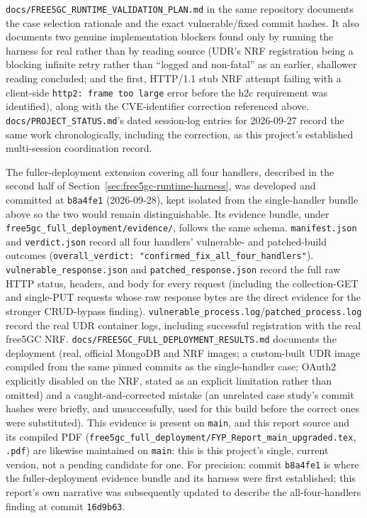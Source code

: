 \documentclass[12pt,a4paper]{report}
\begin{document}
\texttt{docs/FREE5GC\_RUNTIME\_VALIDATION\_PLAN.md} in the same repository documents the case selection rationale and the exact vulnerable/fixed commit hashes. It also documents two genuine implementation blockers found only by running the harness for real rather than by reading source (UDR's NRF registration being a blocking infinite retry rather than ``logged and non-fatal'' as an earlier, shallower reading concluded; and the first, HTTP/1.1 stub NRF attempt failing with a client-side \texttt{http2: frame too large} error before the h2c requirement was identified), along with the CVE-identifier correction referenced above. \texttt{docs/PROJECT\_STATUS.md}'s dated session-log entries for 2026-09-27 record the same work chronologically, including the correction, as this project's established multi-session coordination record.

The fuller-deployment extension covering all four handlers, described in the second half of Section~\ref{sec:free5gc-runtime-harness}, was developed and committed at \texttt{b8a4fe1} (2026-09-28), kept isolated from the single-handler bundle above so the two would remain distinguishable. Its evidence bundle, under \texttt{free5gc\_full\_deployment/evidence/}, follows the same schema. \texttt{manifest.json} and \texttt{verdict.json} record all four handlers' vulnerable- and patched-build outcomes (\texttt{overall\_verdict: "confirmed\_fix\_all\_four\_handlers"}). \texttt{vulnerable\_response.json} and \texttt{patched\_response.json} record the full raw HTTP status, headers, and body for every request (including the collection-GET and single-PUT requests whose raw response bytes are the direct evidence for the stronger CRUD-bypass finding). \texttt{vulnerable\_process.log}/\texttt{patched\_process.log} record the real UDR container logs, including successful registration with the real free5GC NRF. \texttt{docs/FREE5GC\_FULL\_DEPLOYMENT\_RESULTS.md} documents the deployment (real, official MongoDB and NRF images; a custom-built UDR image compiled from the same pinned commits as the single-handler case; OAuth2 explicitly disabled on the NRF, stated as an explicit limitation rather than omitted) and a caught-and-corrected mistake (an unrelated case study's commit hashes were briefly, and unsuccessfully, used for this build before the correct ones were substituted). This evidence is present on \texttt{main}, and this report source and its compiled PDF (\texttt{free5gc\_full\_deployment/FYP\_Report\_main\_upgraded.tex}, \texttt{.pdf}) are likewise maintained on \texttt{main}: this is this project's single, current version, not a pending candidate for one. For precision: commit \texttt{b8a4fe1} is where the fuller-deployment evidence bundle and its harness were first established; this report's own narrative was subsequently updated to describe the all-four-handlers finding at commit \texttt{16d9b63}.
\end{document}
